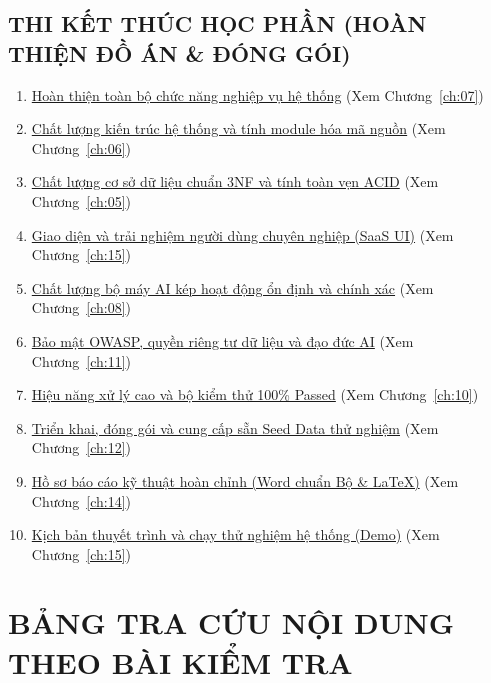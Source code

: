 \documentclass[12pt,a4paper,oneside]{report}
\begin{document}
\section*{\hypertarget{sec:ck_toc}{THI KẾT THÚC HỌC PHẦN (HOÀN THIỆN ĐỒ ÁN \& ĐÓNG GÓI)}}
\begin{enumerate}
    \item \hyperlink{ch:07}{Hoàn thiện toàn bộ chức năng nghiệp vụ hệ thống} (Xem Chương~\ref{ch:07})
    \item \hyperlink{ch:06}{Chất lượng kiến trúc hệ thống và tính module hóa mã nguồn} (Xem Chương~\ref{ch:06})
    \item \hyperlink{ch:05}{Chất lượng cơ sở dữ liệu chuẩn 3NF và tính toàn vẹn ACID} (Xem Chương~\ref{ch:05})
    \item \hyperlink{ch:15}{Giao diện và trải nghiệm người dùng chuyên nghiệp (SaaS UI)} (Xem Chương~\ref{ch:15})
    \item \hyperlink{ch:08}{Chất lượng bộ máy AI kép hoạt động ổn định và chính xác} (Xem Chương~\ref{ch:08})
    \item \hyperlink{ch:11}{Bảo mật OWASP, quyền riêng tư dữ liệu và đạo đức AI} (Xem Chương~\ref{ch:11})
    \item \hyperlink{ch:10}{Hiệu năng xử lý cao và bộ kiểm thử 100\% Passed} (Xem Chương~\ref{ch:10})
    \item \hyperlink{ch:12}{Triển khai, đóng gói và cung cấp sẵn Seed Data thử nghiệm} (Xem Chương~\ref{ch:12})
    \item \hyperlink{ch:14}{Hồ sơ báo cáo kỹ thuật hoàn chỉnh (Word chuẩn Bộ \& LaTeX)} (Xem Chương~\ref{ch:14})
    \item \hyperlink{ch:15}{Kịch bản thuyết trình và chạy thử nghiệm hệ thống (Demo)} (Xem Chương~\ref{ch:15})
\end{enumerate}

\newpage

\listoffigures
\newpage
\listoftables
\newpage

\chapter*{BẢNG TRA CỨU NỘI DUNG THEO BÀI KIỂM TRA}
\end{document}
